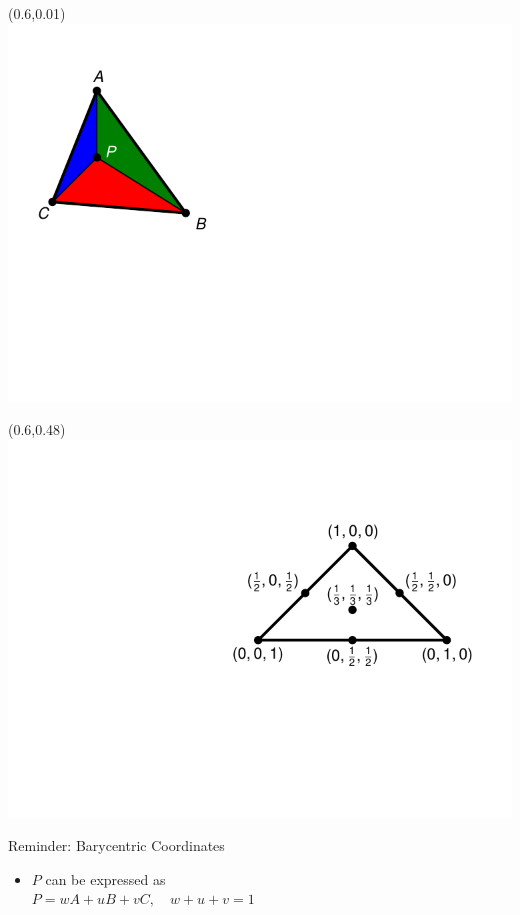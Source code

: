 \documentclass[utf8,stillsansserifmath,fleqn,t]{beamer}
\begin{document}
\begin{frame}
\frametitle{\insertsection}
\begin{textblock}{0.4}(0.6,0.01) \includegraphics[width=\textwidth]{./fig/barycentric-coordinates-0.pdf} \end{textblock}
\begin{textblock}{0.4}(0.6,0.48) \includegraphics[width=\textwidth]{./fig/barycentric-coordinates-1.pdf} \end{textblock}
Reminder: Barycentric Coordinates
\begin{itemize}
\item $P$ can be expressed as\\
    $P = wA + uB + vC,  \quad w + u + v = 1$\\

\end{itemize}
\end{frame}
\end{document}
